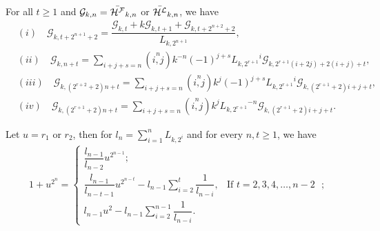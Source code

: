 \begin{theorem}For all $t\geq 1$ and $\mathcal{G}_{k,n}=\bar{{\mathcal{H^F}}}_{k,n}$ or $\bar{{\mathcal{H^L}}}_{k,n}$, we have\label{3.5t}
\begin{align*}
&(i)\quad\mathcal{G}_{k,t+2^{n+1}+2}=\dfrac{\mathcal{G}_{k,t}+k\mathcal{G}_{k,t+1}+\mathcal{G}_{k,t+2^{n+2}+2}}{{L}_{k,2^{n+1}}},\\
&(ii)\quad\mathcal{G}_{k,n+t}=\sum\limits_{i+j+s=n}\left( \stackrel{n}{i,j}\right) k^{-n}(-1)^{j+s}{{L}_{k,2^{r+1}}}^i\mathcal{G}_{k,2^{r+1}(i+2j)+2(i+j)+t},\\
&(iii)\quad\mathcal{G}_{k,(2^{r+2}+2)n+t}=\sum\limits_{i+j+s=n}\left( \stackrel{n}{i,j}\right) k^{j}(-1)^{j+s}{{L}_{k,2^{r+1}}}^i\mathcal{G}_{k,(2^{r+1}+2)i+j+t},\\
&(iv)\quad\mathcal{G}_{k,(2^{r+1}+2)n+t}=\sum\limits_{i+j+s=n}\left( \stackrel{n}{i,j}\right) k^{j}{{L}_{k,2^{r+1}}}^{-n}\mathcal{G}_{k,(2^{r+1}+2)i+j+t}.
\end{align*}
\end{theorem}
\begin{lemma} Let $u=r_{1}$ or $r_{2}$, then for $l_n=\sum\limits_{i=1}^n{L}_{k,2^i}$ and for every $n, t\geq 1$, we have \label{3.6l}
\begin{align*}
 1+u^{2^n}= \begin{cases}
 \dfrac{l_{n-1}}{l_{n-2}}u^{2^{n-1}};\\
\dfrac{l_{n-1}}{l_{n-t-1}}u^{2^{n-t}}-l_{n-1}\sum\limits_{i=2}^{t}\dfrac{1}{l_{n-i}}, & \text{If $t=2, 3, 4,\hdots, n-2 $ };\\l_{n-1}u^2-l_{n-1}\sum\limits_{i=2}^{n-1}\dfrac{1}{l_{n-i}}.
 \end{cases}
\end{align*} 
\end{lemma}
